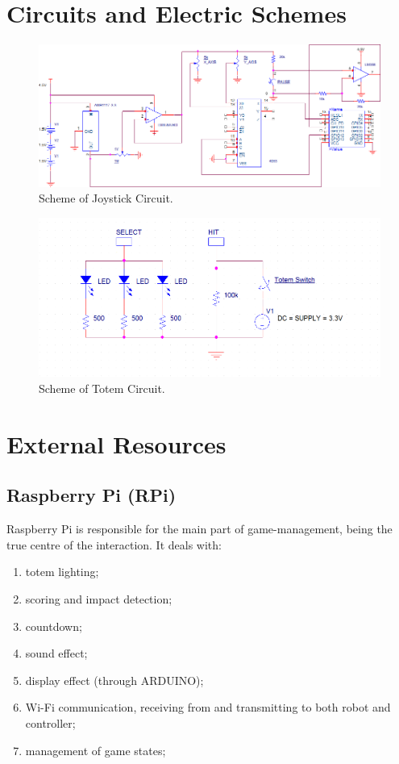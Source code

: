 \documentclass[a4paper,twoside]{book}
\begin{document}
\begin{appendices}

\chapter{Circuits and Electric Schemes}
\label{app:circuit}

\begin{figure}[h]
\includegraphics[width=\linewidth]{img/ControllerCircuitry} 
\caption{Scheme of Joystick Circuit.}
\end{figure}

\begin{figure}[h]
\includegraphics[width=\linewidth]{img/Totem} 
\caption{Scheme of Totem Circuit.}
\end{figure}

\chapter{External Resources}
\label{app:external}

\section{Raspberry Pi (RPi)}
\label{app:RPi}
\beforelist* Raspberry Pi is responsible for the main part of game-management, being the true centre of the interaction. It deals with:
\begin{enumerate}
\item totem lighting;
\item scoring and impact detection;
\item countdown;
\item sound effect;
\item display effect (through ARDUINO);
\item Wi-Fi communication, receiving from and transmitting to both robot and controller;
\item management of game states;
\end {enumerate}


\end{appendices}
\end{document}
